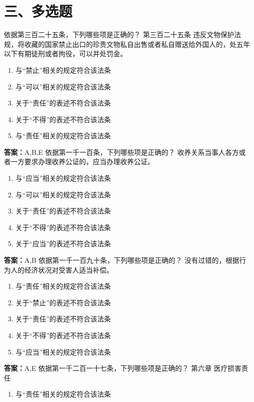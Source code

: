 \documentclass[12pt]{ctexart}
\begin{document}
\section*{三、多选题}
\begin{questions}
\question 依据第三百二十五条，下列哪些项是正确的？
第三百二十五条 违反文物保护法规，将收藏的国家禁止出口的珍贵文物私自出售或者私自赠送给外国人的，处五年以下有期徒刑或者拘役，可以并处罚金。
\begin{enumerate}[label=\Alph*.]
\item 与“禁止”相关的规定符合该法条
\item 与“可以”相关的规定符合该法条
\item 关于“责任”的表述不符合该法条
\item 关于“不得”的表述不符合该法条
\item 与“责任”相关的规定符合该法条
\end{enumerate}
\ifprintanswers\par\textbf{答案：}A,B,E\fi
\question 依据第一千一百条，下列哪些项是正确的？
收养关系当事人各方或者一方要求办理收养公证的，应当办理收养公证。
\begin{enumerate}[label=\Alph*.]
\item 与“应当”相关的规定符合该法条
\item 与“可以”相关的规定符合该法条
\item 关于“责任”的表述不符合该法条
\item 关于“不得”的表述不符合该法条
\item 关于“应当”的表述不符合该法条
\end{enumerate}
\ifprintanswers\par\textbf{答案：}A,B\fi
\question 依据第一千一百九十条，下列哪些项是正确的？
没有过错的，根据行为人的经济状况对受害人适当补偿。
\begin{enumerate}[label=\Alph*.]
\item 与“责任”相关的规定符合该法条
\item 关于“禁止”的表述不符合该法条
\item 关于“责任”的表述不符合该法条
\item 关于“不得”的表述不符合该法条
\item 与“应当”相关的规定符合该法条
\end{enumerate}
\ifprintanswers\par\textbf{答案：}A,E\fi
\question 依据第一千二百一十七条，下列哪些项是正确的？
第六章 医疗损害责任
\begin{enumerate}[label=\Alph*.]
\item 与“责任”相关的规定符合该法条

\end{enumerate}
\end{questions}
\end{document}
